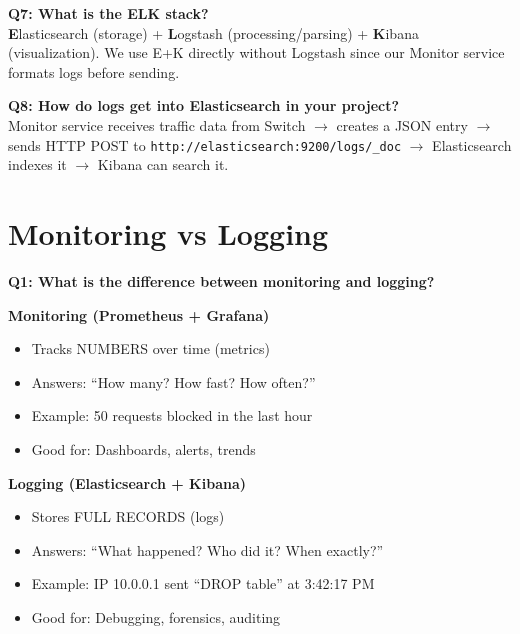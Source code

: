 \documentclass[12pt,a4paper]{article}
\begin{document}
\textbf{Q7: What is the ELK stack?}\\
\textbf{E}lasticsearch (storage) + \textbf{L}ogstash (processing/parsing) + \textbf{K}ibana (visualization). We use E+K directly without Logstash since our Monitor service formats logs before sending.

\textbf{Q8: How do logs get into Elasticsearch in your project?}\\
Monitor service receives traffic data from Switch $\rightarrow$ creates a JSON entry $\rightarrow$ sends HTTP POST to \texttt{http://elasticsearch:9200/logs/\_doc} $\rightarrow$ Elasticsearch indexes it $\rightarrow$ Kibana can search it.

\section{Monitoring vs Logging}

\textbf{Q1: What is the difference between monitoring and logging?}

\begin{tcolorbox}[colback=blue!5, colframe=blue!50!black]
\textbf{Monitoring (Prometheus + Grafana)}
\begin{itemize}[noitemsep]
    \item Tracks NUMBERS over time (metrics)
    \item Answers: ``How many? How fast? How often?''
    \item Example: 50 requests blocked in the last hour
    \item Good for: Dashboards, alerts, trends
\end{itemize}
\end{tcolorbox}

\begin{tcolorbox}[colback=green!5, colframe=green!50!black]
\textbf{Logging (Elasticsearch + Kibana)}
\begin{itemize}[noitemsep]
    \item Stores FULL RECORDS (logs)
    \item Answers: ``What happened? Who did it? When exactly?''
    \item Example: IP 10.0.0.1 sent ``DROP table'' at 3:42:17 PM
    \item Good for: Debugging, forensics, auditing
\end{itemize}
\end{tcolorbox}
\end{document}
